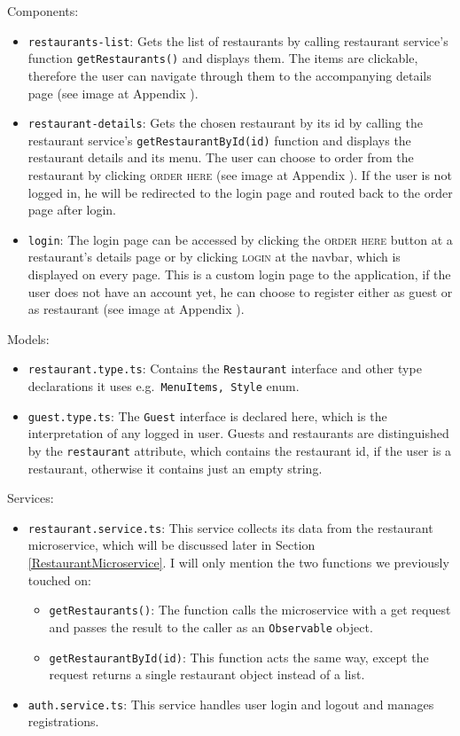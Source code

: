 Components:
\begin{itemize}
	\item \verb+restaurants-list+: Gets the list of restaurants by calling restaurant service's function \verb+getRestaurants()+ and displays them. The items are clickable, therefore the user can navigate through them to the accompanying details page (see image at Appendix ).
	
	\item \verb+restaurant-details+: Gets the chosen restaurant by its id by calling the restaurant service's \verb+getRestaurantById(id)+ function and displays the restaurant details and its menu. The user can choose to order from the restaurant by clicking \textsc{order here} (see image at Appendix ). If the user is not logged in, he will be redirected to the login page and routed back to the order page after login.
	
	\item \verb+login+: The login page can be accessed by clicking the \textsc{order here} button at a restaurant's details page or by clicking \textsc{login} at the navbar, which is displayed on every page. This is a custom login page to the application, if the user does not have an account yet, he can choose to register either as guest or as restaurant (see image at Appendix ).
\end{itemize}
Models:
\begin{itemize}
	\item \verb+restaurant.type.ts+: Contains the \verb+Restaurant+ interface and other type declarations it uses e.g.\ \verb+MenuItems, Style+ enum.
	\item \verb+guest.type.ts+: The \verb+Guest+ interface is declared here, which is the interpretation of any logged in user. Guests and restaurants are distinguished by the \verb+restaurant+ attribute, which contains the restaurant id, if the user is a restaurant, otherwise it contains just an empty string.
\end{itemize}
Services:
\begin{itemize}
	\item \verb+restaurant.service.ts+: This service collects its data from the restaurant microservice, which will be discussed later in Section \ref{RestaurantMicroservice}. I will only mention the two functions we previously touched on:
	\begin{itemize}
		\item\verb+getRestaurants()+: The function calls the microservice with a get request and passes the result to the caller as an \verb+Observable+ object.
		\item\verb+getRestaurantById(id)+: This function acts the same way, except the request returns a single restaurant object instead of a list.
	\end{itemize}	
	\item \verb+auth.service.ts+: This service handles user login and logout and manages registrations. 
\end{itemize}

